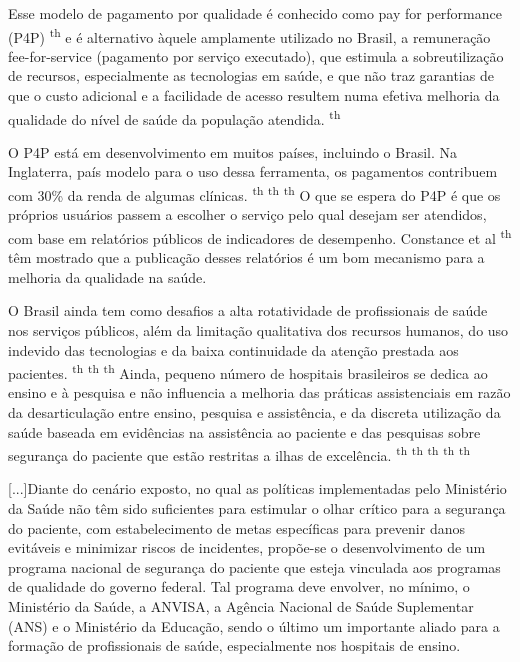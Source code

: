 \documentclass{article}
\begin{document}
Esse modelo de pagamento por qualidade é conhecido como pay for
performance (P4P) \textsuperscript{th}
e é alternativo àquele amplamente utilizado no Brasil, a remuneração
fee-for-service (pagamento por serviço executado), que estimula a
sobreutilização de recursos, especialmente as tecnologias em saúde, e que não
traz garantias
de que o custo adicional e a facilidade de acesso resultem numa efetiva melhoria
da
qualidade do nível de saúde da população atendida. \textsuperscript{th}

O P4P está em desenvolvimento em muitos países, incluindo o Brasil. Na
Inglaterra, país
modelo para o uso dessa ferramenta, os pagamentos contribuem com 30\% da renda
de algumas
clínicas. \textsuperscript{th}
\textsuperscript{th}
\textsuperscript{th}
O que se espera do P4P é que os próprios usuários passem a escolher o serviço
pelo
qual desejam ser atendidos, com base em relatórios públicos de indicadores de
desempenho.
Constance et al \textsuperscript{th}
têm mostrado que a publicação desses relatórios é um bom mecanismo para a
melhoria
da qualidade na saúde.

O Brasil ainda tem como desafios a alta rotatividade de profissionais de saúde
nos serviços
públicos, além da limitação qualitativa dos recursos humanos, do uso indevido
das
tecnologias e da baixa continuidade da atenção prestada aos pacientes.
\textsuperscript{th}
\textsuperscript{th}
\textsuperscript{th}
Ainda, pequeno número de hospitais brasileiros se dedica ao ensino e à pesquisa
e
não influencia a melhoria das práticas assistenciais em razão da desarticulação
entre
ensino, pesquisa e assistência, e da discreta utilização da saúde baseada em
evidências na
assistência ao paciente e das pesquisas sobre segurança do paciente que estão
restritas a
ilhas de excelência. \textsuperscript{th}
\textsuperscript{th}
\textsuperscript{th}
\textsuperscript{th}
\textsuperscript{th}

[...]Diante do cenário exposto, no qual as políticas implementadas pelo
Ministério da Saúde não
têm sido suficientes para estimular o olhar crítico para a segurança do
paciente, com
estabelecimento de metas específicas para prevenir danos evitáveis e minimizar
riscos de
incidentes, propõe-se o desenvolvimento de um programa nacional de segurança do
paciente que
esteja vinculada aos programas de qualidade do governo federal. Tal programa
deve envolver,
no mínimo, o Ministério da Saúde, a ANVISA, a Agência Nacional de Saúde
Suplementar (ANS) e
o Ministério da Educação, sendo o último um importante aliado para a formação de
profissionais de saúde, especialmente nos hospitais de ensino.
\end{document}
